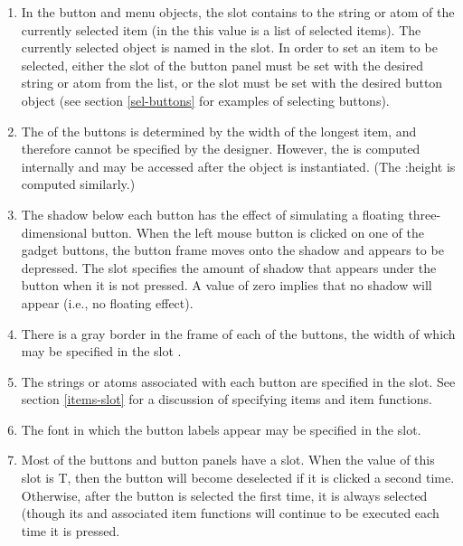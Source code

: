 \begin{enumerate}
\item In the button and menu objects, the  slot contains to the
string or atom of the currently selected item (in the
 this value is a list of selected items).  The
currently selected object is named in the  slot.  In
order to set an item to be selected, either the  slot of
the button panel must be set with the desired string or atom from the
 list, or the  slot must be set with the
desired button object (see section \ref{sel-buttons} for examples of
selecting buttons).

\item The  of the buttons is determined by the width of the
longest item, and therefore cannot be specified by the designer.
However, the  is computed internally and may be accessed
after the object is instantiated.  (The :height is computed
similarly.)

\item The shadow below each button has the effect of simulating a floating
three-dimensional button.  When the left mouse button is clicked on
one of the gadget buttons, the button frame moves onto the shadow and
appears to be depressed.  The slot  specifies the
amount of shadow that appears under the button when it is not pressed.
A value of zero implies that no shadow will appear (i.e., no floating
effect).

\item There is a gray border in the frame of each of the buttons, the width
of which may be specified in the slot .

\item The strings or atoms associated with each button are specified in the
 slot.  See section \ref{items-slot} for a discussion of
specifying items and item functions.

\item The font in which the button labels appear may be specified in the
 slot.

\item Most of the buttons and button panels have a  slot.
When the value of this slot is T, then the button will become
deselected if it is clicked a second time.  Otherwise, after the
button is selected the first time, it is always selected (though its
 and associated item functions will continue
to be executed each time it is pressed.
\end{enumerate}

